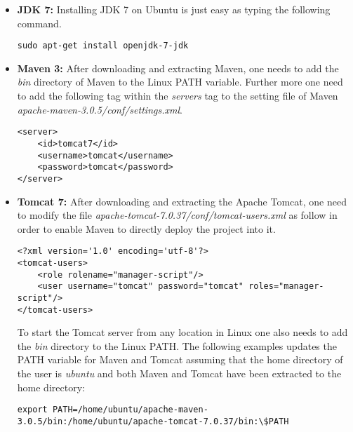\begin{itemize}
\item{\textbf{\ac{JDK} 7:}} Installing  \ac{JDK} 7 on Ubuntu is just easy as typing the following command.%
\begin{code}
\begin{verbatim}
sudo apt-get install openjdk-7-jdk
\end{verbatim}
\end{code}

\item{\textbf{Maven 3:}}  After downloading and extracting Maven, one needs to add the \textit{bin} directory of Maven to the Linux PATH variable. Further more one need to add the following tag within the \textit{servers} tag to the setting file of Maven \textit{apache-maven-3.0.5/conf/settings.xml}.
\begin{code}
\begin{verbatim}
<server>
	<id>tomcat7</id>
	<username>tomcat</username>
	<password>tomcat</password>
</server>
\end{verbatim}
\end{code}

\item{\textbf{Tomcat 7:}} After downloading and extracting the Apache Tomcat, one need to modify the file \textit{apache-tomcat-7.0.37/conf/tomcat-users.xml} as follow in order to enable Maven to directly deploy the project into it. 
\begin{code}
\begin{verbatim}
<?xml version='1.0' encoding='utf-8'?>
<tomcat-users>
	<role rolename="manager-script"/>
	<user username="tomcat" password="tomcat" roles="manager-script"/>
</tomcat-users>
\end{verbatim}
\end{code}

To start the Tomcat server from any location in Linux one also needs to add the \textit{bin} directory to the Linux PATH. The following examples updates the PATH variable for Maven and Tomcat assuming that the home directory of the user is \textit{ubuntu} and both Maven and Tomcat have been extracted to the home directory:
\begin{code}
\begin{verbatim}
export PATH=/home/ubuntu/apache-maven-3.0.5/bin:/home/ubuntu/apache-tomcat-7.0.37/bin:\$PATH
\end{verbatim}
\end{code}


\end{itemize}
